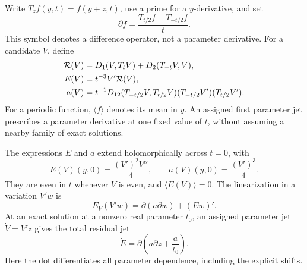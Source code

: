 Write \(T_zf(y,t)=f(y+z,t)\), use a prime for a \(y\)-derivative,
and set
\[
 \partial f=\frac{T_{t/2}f-T_{-t/2}f}{t}.
\]
This symbol denotes a difference operator, not a parameter derivative.
For a candidate \(V\), define
\begin{align}
 \mathcal R(V)&=D_1(V,T_tV)+D_2(T_{-t}V,V),\notag\\
 E(V)&=t^{-3}V'\mathcal R(V),
 \label{joint:residual}\\
 a(V)&=t^{-1}D_{12}(T_{-t/2}V,T_{t/2}V)
                  (T_{-t/2}V')(T_{t/2}V').
 \label{joint:a}
\end{align}
For a periodic function, \(\langle f\rangle\) denotes its mean in \(y\).
An assigned first parameter jet prescribes a parameter derivative at one
fixed value of \(t\), without assuming a nearby family of exact solutions.

\begin{lemma}
\label{joint:factorization}
The expressions \(E\) and \(a\) extend holomorphically across \(t=0\),
with
\begin{equation}
 E(V)(y,0)=\frac{(V')^2V''}{4},\qquad
 a(V)(y,0)=\frac{(V')^3}{4}.
 \label{joint:at-zero}
\end{equation}
They are even in \(t\) whenever \(V\) is even, and
\(\langle E(V)\rangle=0\).  The linearization in a variation \(V'w\)
is
\begin{equation}
 E_V(V'w)=\partial(a\partial w)+(Ew)'.
 \label{joint:linearization}
\end{equation}
At an exact solution at a nonzero real parameter \(t_0\), an assigned
parameter jet \(\dot V=V'z\) gives the total residual jet
\begin{equation}
 \dot E=\partial\left(a\partial z+\frac{a}{t_0}\right).
 \label{joint:parameter-jet}
\end{equation}
Here the dot differentiates all parameter dependence, including the
explicit shifts.
\end{lemma}

